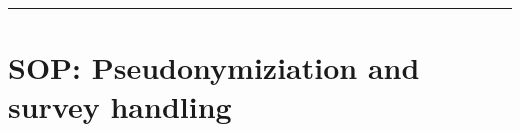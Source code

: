 \par\noindent\rule{\textwidth\color{pniblue}}{0.4pt}
\section{SOP: Pseudonymiziation and survey handling}
\label{section:sop_ls}